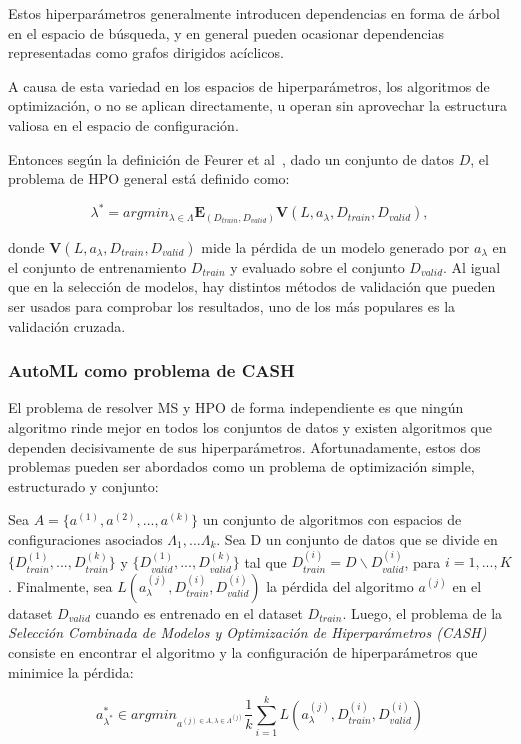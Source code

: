 Estos hiperparámetros generalmente introducen dependencias en forma de árbol en el espacio de búsqueda, y en general pueden ocasionar dependencias representadas como grafos dirigidos acíclicos.


A causa de esta variedad en los espacios de hiperparámetros, los algoritmos de optimización, o no se aplican directamente, u operan sin aprovechar la estructura valiosa en el espacio de configuración.

Entonces según la definición de Feurer et al~\cite{fuerer2015efficient}, dado un conjunto de datos $D$, el problema de HPO general está definido como:

\begin{equation}
	\lambda^* = argmin_{\lambda \in \Lambda}\textbf{E}_{(D_{train}, D_{valid})}\textbf{V}(L, a_\lambda, D_{train}, D_{valid}),
\end{equation}

donde $\textbf{V}(L, a_\lambda, D_{train}, D_{valid})$ mide la pérdida de un modelo generado por $a_\lambda$ en el conjunto de entrenamiento $D_{train}$ y evaluado sobre el conjunto $D_{valid}$. Al igual que en la selección de modelos, hay distintos métodos de validación que pueden ser usados para comprobar los resultados, uno de los más populares es la validación cruzada.

\subsubsection{AutoML como problema de CASH} 

El problema de resolver MS y HPO de forma independiente es que ningún algoritmo rinde mejor en todos los conjuntos de datos y existen algoritmos que dependen decisivamente de sus hiperparámetros. Afortunadamente, estos dos problemas pueden ser abordados como un problema de optimización simple, estructurado y conjunto:

\begin{definition}
	Sea $A = \{a^{(1)}, a^{(2)}, ..., a^{(k)}\}$ un conjunto de algoritmos con espacios de configuraciones asociados $\Lambda_1, ... \Lambda_k$. Sea D un conjunto de datos que se divide en $\{D_{train}^{(1)}, ..., D_{train}^{(k)}\}$ y $\{D_{valid}^{(1)}, ..., D_{valid}^{(k)}\}$ tal que $D^{(i)}_{train} = D\backslash D_{valid}^{(i)}$, para $i=1,...,K$. Finalmente, sea $L(a_\lambda^{(j)}, D_{train}^{(i)}, D_{valid}^{(i)})$ la pérdida del algoritmo $a^{(j)}$ en el dataset $D_{valid}$ cuando es entrenado en el dataset $D_{train}$. Luego, el problema de la \textsl{Selección Combinada de Modelos y Optimización de Hiperparámetros (CASH)} consiste en encontrar el algoritmo y la configuración de hiperparámetros que minimice la pérdida:
	
	\begin{equation}\label{cash}
	 a^*_{\lambda^*} \in argmin_{a^{(j) \in A, \lambda \in \Lambda^{(j)}}} \dfrac{1}{k} \sum_{i=1}^{k} L\left(a_\lambda^{(j)}, D_{train}^{(i)}, D_{valid}^{(i)}\right)
	\end{equation}
\end{definition}   

